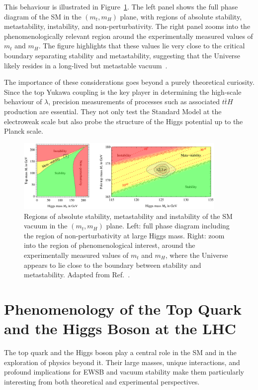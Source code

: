This behaviour is illustrated in Figure~\ref{fig:vacuum_stability}. The left panel shows the full phase diagram of the SM in the $(m_t,m_H)$ plane, with regions of absolute stability, metastability, instability, and non-perturbativity. The right panel zooms into the phenomenologically relevant region around the experimentally measured values of $m_t$ and $m_H$. The figure highlights that these values lie very close to the critical boundary separating stability and metastability, suggesting that the Universe likely resides in a long-lived but metastable vacuum~\cite{Degrassi_2012}.

The importance of these considerations goes beyond a purely theoretical curiosity. Since the top Yukawa coupling is the key player in determining the high-scale behaviour of $\lambda$, precision measurements of processes such as associated $t\bar{t}H$ production are essential. They not only test the Standard Model at the electroweak scale but also probe the structure of the Higgs potential up to the Planck scale.

\begin{figure}[htbp]
    \centering
    \includegraphics[width=0.9\textwidth]{images/vacuum.png}
    \caption{
        Regions of absolute stability, metastability and instability of the SM vacuum in the $(m_t, m_H)$ plane. 
        Left: full phase diagram including the region of non-perturbativity at large Higgs mass. 
        Right: zoom into the region of phenomenological interest, around the experimentally measured values of $m_t$ and $m_H$, where the Universe appears to lie close to the boundary between stability and metastability. 
        Adapted from Ref.~\cite{Degrassi_2012}.
    }
    \label{fig:vacuum_stability}
\end{figure}
\section{Phenomenology of the Top Quark and the Higgs Boson at the LHC}
\label{sec:top_higgs_lhc}
The top quark and the Higgs boson play a central role in the SM and in the exploration of physics beyond it. Their large masses, unique interactions, and profound implications for EWSB and vacuum stability make them particularly interesting from both theoretical and experimental perspectives. 

